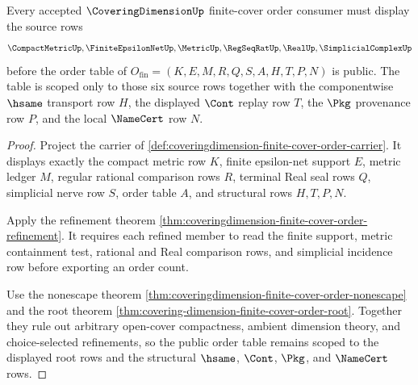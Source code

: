 \begin{theorem}
\label{thm:coveringdimension-finite-cover-order-scope}
Every accepted $\CoveringDimensionUp$ finite-cover order consumer must display the source rows
$$
\CompactMetricUp,\FiniteEpsilonNetUp,\MetricUp,\RegSeqRatUp,\RealUp,\SimplicialComplexUp
$$
before the order table of $O_{\mathrm{fin}}=(K,E,M,R,Q,S,A,H,T,P,N)$ is public. The table is scoped only to those six source rows together with the componentwise $\hsame$ transport row $H$, the displayed $\Cont$ replay row $T$, the $\Pkg$ provenance row $P$, and the local $\NameCert$ row $N$.
\end{theorem}
\begin{proof}
Project the carrier of \autoref{def:coveringdimension-finite-cover-order-carrier}. It displays exactly the compact metric row $K$, finite epsilon-net support $E$, metric ledger $M$, regular rational comparison rows $R$, terminal Real seal rows $Q$, simplicial nerve row $S$, order table $A$, and structural rows $H,T,P,N$.

Apply the refinement theorem \autoref{thm:coveringdimension-finite-cover-order-refinement}. It requires each refined member to read the finite support, metric containment test, rational and Real comparison rows, and simplicial incidence row before exporting an order count.

Use the nonescape theorem \autoref{thm:coveringdimension-finite-cover-order-nonescape} and the root theorem \autoref{thm:covering-dimension-finite-cover-order-root}. Together they rule out arbitrary open-cover compactness, ambient dimension theory, and choice-selected refinements, so the public order table remains scoped to the displayed root rows and the structural $\hsame$, $\Cont$, $\Pkg$, and $\NameCert$ rows.
\end{proof}

